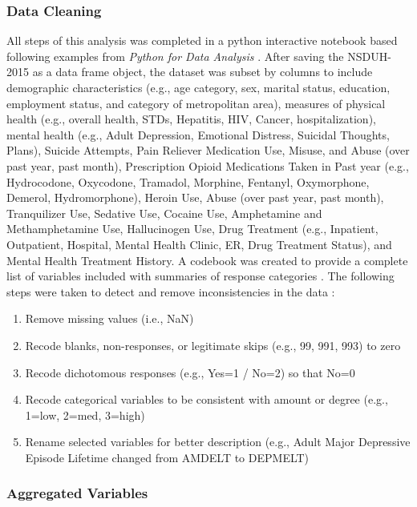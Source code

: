 \documentclass[sigconf]{acmart}
\begin{document}
\subsubsection{Data Cleaning}
All steps of this analysis was completed in a python interactive notebook 
\cite{data17} based following examples from \emph{Python for Data Analysis}
\cite{mckinney17}. After saving the NSDUH-2015 as a data frame object, the 
dataset was subset by columns to include demographic characteristics (e.g., 
age category, sex, marital status, education, employment status, and category 
of metropolitan area), measures of physical health (e.g., overall health, 
STDs, Hepatitis, HIV, Cancer, hospitalization), mental health (e.g., Adult 
Depression, Emotional Distress, Suicidal Thoughts, Plans), Suicide Attempts, 
Pain Reliever Medication Use, Misuse, and Abuse (over past year, past month), 
Prescription Opioid Medications Taken in Past year (e.g., Hydrocodone, 
Oxycodone, Tramadol, Morphine, Fentanyl, Oxymorphone, Demerol, Hydromorphone), 
Heroin Use, Abuse (over past year, past month), Tranquilizer Use, Sedative Use, 
Cocaine Use, Amphetamine and Methamphetamine Use, Hallucinogen Use, Drug 
Treatment (e.g., Inpatient, Outpatient, Hospital, Mental Health Clinic, ER, 
Drug Treatment Status), and Mental Health Treatment History. A codebook was 
created to provide a complete list of variables included with summaries 
of response categories \cite{codebook17}. The following steps were taken 
to detect and remove inconsistencies in the data \cite{rahm00}:
\begin{enumerate}
  \item Remove missing values (i.e., NaN) 
  \item Recode blanks, non-responses, or legitimate skips (e.g., 99, 991, 
  993) to zero  
  \item Recode dichotomous responses (e.g., Yes=1 / No=2) so that No=0
  \item Recode categorical variables to be consistent with amount or degree 
  (e.g., 1=low, 2=med, 3=high)
   \item Rename selected variables for better description (e.g., 
   Adult Major Depressive Episode Lifetime changed from AMDELT to DEPMELT)
\end{enumerate}

\subsubsection{Aggregated Variables}
\end{document}
